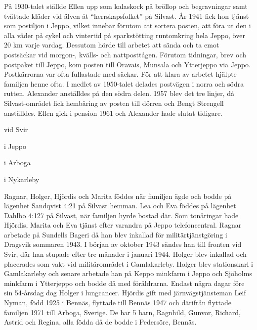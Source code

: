 På 1930-talet ställde Ellen upp som kalaskock på bröllop och begravningar samt tvättade kläder vid älven åt ``herrskapsfolket'' på Silvast. År 1941 fick hon tjänst som postiljon i Jeppo, vilket innebar förutom att sortera posten, att föra ut den i alla väder på cykel och vintertid på sparkstötting runtomkring hela Jeppo, över 20 km varje vardag. Dessutom hörde till arbetet att sända och ta emot postsäckar vid morgon-, kvälls- och nattposttågen. Förutom tidningar, brev och postpaket till Jeppo, kom posten till Oravais, Munsala och Ytterjeppo via Jeppo. Postkärrorna var ofta fullastade med säckar. För att klara av arbetet hjälpte familjen henne ofta.  I medlet av 1950-talet delades postvägen i norra och södra rutten. Alexander anställdes på den södra delen. 1957 blev det tre linjer, då Silvast-området fick hembäring av posten till dörren och Bengt Strengell anställdes. Ellen gick i pension 1961 och Alexander hade slutat tidigare.
\begin{jhchildren}
  \item {} vid Svir
  \item {} i Jeppo
  \item {} i Arboga
  \item {} i Nykarleby
  \item {}
  \item {}
\end{jhchildren}

Ragnar, Holger, Hjördis och Marita föddes när familjen ägde och bodde på lägenhet Sandqvist 4:21 på Silvast hemman. Lea och Eva föddes på lägenhet Dahlbo 4:127 på Silvast, när familjen hyrde bostad där. Som tonåringar hade Hjördis, Marita och Eva tjänst efter varandra på Jeppo telefoncentral. Ragnar arbetade på Sundells Bageri då han blev inkallad för militärtjänstgöring i Dragsvik sommaren 1943. I början av oktober 1943 sändes han till fronten vid Svir, där han stupade efter tre månader i januari 1944. Holger blev inkallad och placerades som vakt vid militärområdet i Gamlakarleby. Holger blev stationskarl i Gamlakarleby och senare arbetade han på Keppo minkfarm i Jeppo och Sjöholms minkfarm i Ytterjeppo och bodde då med föräldrarna. Endast några dagar före sin 54-årsdag dog Holger i lungcancer. Hjördis gift med järnvägstjänsteman Leif Nyman, född 1925 i Bennäs, flyttade till Bennäs 1947 och därifrån flyttade familjen 1971 till Arboga, Sverige. De har 5 barn, Ragnhild, Gunvor, Richard, Astrid och Regina, alla födda då de bodde i Pedersöre, Bennäs.

